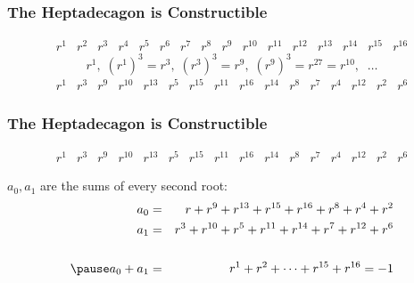 \documentclass{beamer}
\begin{document}

\begin{frame}
\frametitle{The Heptadecagon is Constructible}
\[
\begin{array}{rrrrrrrrrrrrrrrr}
r^1\!&\! r^2\!&\! r^3\!&\! r^{4}\!&\! r^{5}\!&\! r^6\!&\! r^{7}\!&\! r^{8}\!&\! r^{9}\!&\! r^{10}\!&\! r^{11}\!&\! r^{12}\!&\! r^{13}\!&\! r^{14}\!&\! r^{15}\!&\! r^{16}
\end{array}
\]
\pause
\[
r^1, \;(r^1)^3 =r^3,\; (r^3)^3=r^9,\; (r^9)^3=r^{27}=r^{10}, \;  \;\ldots
\]
\pause
\[
\begin{array}{rrrrrrrrrrrrrrrr}
r^1\!&\! r^3\!&\! r^9\!&\! r^{10}\!&\! r^{13}\!&\! r^5\!&\! r^{15}\!&\! r^{11}\!&\! r^{16}\!&\! r^{14}\!&\! r^8\!&\! r^7\!&\! r^4\!&\! r^{12}\!&\! r^2\!&\! r^6
\end{array}
\]
\end{frame}

\begin{frame}
\frametitle{The Heptadecagon is Constructible}

\[
\begin{array}{rrrrrrrrrrrrrrrr}
r^1\!&\! r^3\!&\! r^9\!&\! r^{10}\!&\! r^{13}\!&\! r^5\!&\! r^{15}\!&\! r^{11}\!&\! r^{16}\!&\! r^{14}\!&\! r^8\!&\! r^7\!&\! r^4\!&\! r^{12}\!&\! r^2\!&\! r^6
\end{array}
\]

\medskip
$a_0,a_1$ are the sums of every second root:
\begin{eqnarray*}
a_0&=&r + r^9 + r^{13} +r^{15} +r^{16} + r^8+r^4+r^2\\
a_1&=&r^3 + r^{10} + r^{5} +r^{11} +r^{14} + r^7+r^{12}+r^6\\\\
\pause
a_0+a_1&=&r^1+r^2+\cdots+r^{15}+r^{16}= -1
\end{eqnarray*}

\end{frame}

\end{document}
